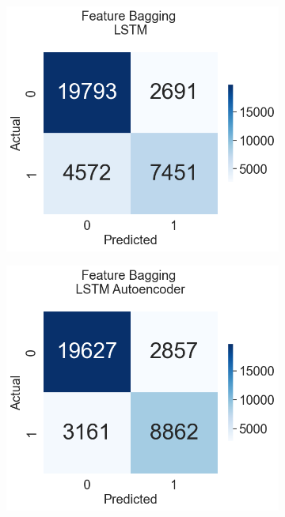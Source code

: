 \documentclass[a4paper,12pt]{report}
\theoremstyle{definitionNODot}
\begin{document}
\begin{figure}[H]
\begin{subfigure}[b]{0.35\textwidth}
			\label{fig:anomaly_by_ensemble_ensemble_conv_ae}
		\end{subfigure}
		\medskip
		\begin{subfigure}[b]{0.35\textwidth}
			\centering
			\includegraphics[width=\textwidth]{anomaly_by_ensemble_ensemble_lstm.png}
			
			\label{fig:anomaly_by_ensemble_ensemble_lstm}
		\end{subfigure}
		\hfil
		\begin{subfigure}[b]{0.35\textwidth}
			\centering
			\includegraphics[width=\textwidth]{anomaly_by_ensemble_ensemble_lstm_ae.png}
			

\end{subfigure}
\end{figure}
\end{document}
